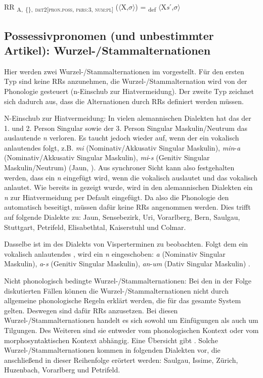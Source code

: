 \ea%
\label{ex:key:154}
 RR \textsubscript{A,} \textsubscript{\{\},} \textsubscript{\textsc{det2[pron.poss}, \textsc{pers:3}, \textsc{num:pl}]} ($\langle$X,$\sigma$$\rangle$) = \textsubscript{def} $\langle$X\textit{s}ˊ,$\sigma$$\rangle$
\z

\subsection{Possessivpronomen (und unbestimmter Artikel): Wur\-zel-/Stamm\-al\-ter\-na\-tio\-nen}\label{5.6.8}

Hier werden zwei Wur\-zel-/Stamm\-al\-ter\-na\-tio\-nen im  vorgestellt. Für den ersten Typ sind keine RRs anzunehmen, die Wur\-zel-/Stamm\-al\-ter\-na\-tion wird von der Phonologie gesteuert (n-Einschub zur Hiatvermeidung). Der zweite Typ zeichnet sich dadurch aus, dass die Alternationen durch RRs definiert werden müssen.\largerpage

{N-Einschub zur Hiatvermeidung}: In vielen alemannischen Dialekten hat das  der 1. und 2. Person Singular sowie der 3. Person Singular Maskulin/Neutrum das auslautende \textit{n} verloren. Es taucht jedoch wieder auf, wenn der  ein vokalisch anlautendes  folgt, z.B. \textit{mi} (Nominativ/Akkusativ Singular Maskulin), \textit{min}-\textit{a} (Nominativ/Akkusativ Singular Maskulin), \textit{mi}-\textit{s} (Genitiv Singular Maskulin/Neutrum) (Jaun, \citealt[284]{Stucki1917}). Aus synchroner Sicht kann also festgehalten werden, dass ein \textit{n} eingefügt wird, wenn die  vokalisch auslautet und das  vokalisch anlautet. Wie bereits in  gezeigt wurde, wird in den alemannischen Dialekten ein \textit{n} zur Hiatvermeidung per Default eingefügt. Da also die Phonologie den  automatisch beseitigt, müssen dafür keine RRs angenommen werden. Dies trifft auf folgende Dialekte zu: Jaun, Sensebezirk, Uri, Vorarlberg, Bern, Saulgau, Stuttgart, Petrifeld, Elisabethtal, Kaiserstuhl und Colmar.

Dasselbe ist im  des Dialekts von Visperterminen zu beobachten. Folgt dem  ein vokalisch anlautendes , wird ein \textit{n} eingeschoben: \textit{a} (Nominativ Singular Maskulin), \textit{a}-\textit{s} (Genitiv Singular Maskulin), \textit{an}-\textit{um} (Dativ Singular Maskulin) \citep[137]{Wipf1911}.

{Nicht phonologisch bedingte Wur\-zel-/Stamm\-al\-ter\-na\-tio\-nen}: Bei den in der Folge diskutierten Fällen können die Wur\-zel-/Stamm\-al\-ter\-na\-tio\-nen nicht durch allgemeine phonologische Regeln erklärt werden, die für das gesamte System gelten. Deswegen sind dafür RRs anzusetzen. Bei diesen  Wur\-zel-/Stamm\-al\-ter\-na\-tio\-nen handelt es sich sowohl um Einfügungen als auch um Tilgungen. Des Weiteren sind sie entweder vom phonologischen Kontext oder vom morphosyntaktischen Kontext abhängig. Eine Übersicht gibt . Solche  Wur\-zel-/Stamm\-al\-ter\-na\-tio\-nen kommen in folgenden Dialekten vor, die anschließend in dieser Reihenfolge erörtert werden: Saulgau, Issime, Zürich, Huzenbach, Vorarlberg und Petrifeld.

